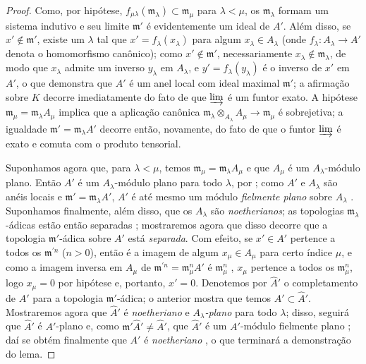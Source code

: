 \begin{proof}
Como, por hipótese, $f_{\mu\lambda}(\mathfrak{m}_\lambda)\subset\mathfrak{m}_\mu$ para $\lambda<\mu$, os $\mathfrak{m}_\lambda$ formam um sistema indutivo e seu limite $\mathfrak{m}'$ é evidentemente um ideal de $A'$.
Além disso, se $x'\not\in\mathfrak{m}'$, existe um $\lambda$ tal que $x'=f_\lambda(x_\lambda)$ para algum $x_\lambda\in A_\lambda$ (onde $f_\lambda:A_\lambda\to A'$ denota o homomorfismo canônico);
como $x'\not\in\mathfrak{m}'$, necessariamente $x_\lambda\not\in\mathfrak{m}_\lambda$, de modo que $x_\lambda$ admite um inverso $y_\lambda$ em $A_\lambda$, e $y'=f_\lambda(y_\lambda)$ é o inverso de $x'$ em $A'$, o que demonstra que $A'$ é um anel local com ideal maximal $\mathfrak{m}'$;
a afirmação sobre $K$ decorre imediatamente do fato de que $\varinjlim$ é um funtor exato.
A hipótese $\mathfrak{m}_\mu=\mathfrak{m}_\lambda A_\mu$ implica que a aplicação canônica $\mathfrak{m}_\lambda\otimes_{A_\lambda}A_\mu\to\mathfrak{m}_\mu$ é sobrejetiva;
a igualdade $\mathfrak{m}'=\mathfrak{m}_\lambda A'$ decorre então, novamente, do fato de que o funtor $\varinjlim$ é exato e comuta com o produto tensorial.

Suponhamos agora que, para $\lambda<\mu$, temos $\mathfrak{m}_\mu=\mathfrak{m}_\lambda A_\mu$ e que $A_\mu$ é um $A_\lambda$-módulo plano.
Então $A'$ é um $A_\lambda$-módulo plano para todo $\lambda$, por ;
como $A'$ e $A_\lambda$ são anéis locais e $\mathfrak{m}'=\mathfrak{m}_\lambda A'$, $A'$ é até mesmo um módulo \emph{fielmente plano} sobre $A_\lambda$ .
Suponhamos finalmente, além disso, que os $A_\lambda$ são \emph{noetherianos};
as topologias $\mathfrak{m}_\lambda$-ádicas estão então separadas ;
mostraremos agora que disso decorre que a topologia $\mathfrak{m}'$-ádica sobre $A'$ está \emph{separada}.
Com efeito, se $x'\in A'$ pertence a todos os $\mathfrak{m}^{'n}$ ($n>0$), então é a imagem de algum $x_\mu\in A_\mu$ para certo índice $\mu$, e como a imagem inversa em $A_\mu$ de $\mathfrak{m}^{'n}=\mathfrak{m}_\mu^n A'$ é $\mathfrak{m}_\mu^n$ , $x_\mu$ pertence a todos os $\mathfrak{m}_\mu^n$, logo $x_\mu=0$ por hipótese e, portanto, $x'=0$.
Denotemos por $\widehat{A}'$ o completamento de $A'$ para a topologia $\mathfrak{m}'$-ádica;
o anterior mostra que temos $A'\subset\widehat{A}'$.
Mostraremos agora que $\widehat{A}'$ é \emph{noetheriano} e \emph{$A_\lambda$-plano} para todo $\lambda$;
disso,
seguirá que $\widehat{A}'$ é $A'$-plano  e, como $\mathfrak{m}'\widehat{A}'\neq\widehat{A}'$, que $\widehat{A}'$ é um $A'$-módulo fielmente plano ; daí se obtém finalmente que $A'$ é \emph{noetheriano} , o que terminará a demonstração do lema.


\end{proof}
